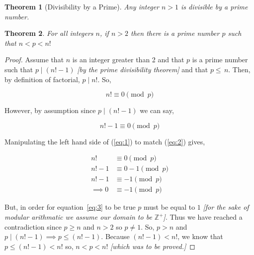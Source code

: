 \documentclass{article}
\newtheorem{theorem}{Theorem}
\begin{document}
\begin{theorem}[Divisibility by a Prime]
Any integer $n>1$ is divisible by a prime number.
\end{theorem}

\begin{theorem}
For all integers $n$, if $n>2$ then there is a prime number $p$ such that $n<p<n\textbf{!}$
\end{theorem}

\begin{proof}
  Assume that $n$ is an integer greater than 2 and that $p$ is a prime number such that $p \mid \left(n\textbf{!} - 1\right)$ \textit{[by the prime divisibility theorem]} and that $p\leq\,n$. Then, by definition of factorial, $p \mid n\textbf{!}$. So, 

  \begin{equation}
    n\textbf{!} \equiv 0 \pmod{p}
  \label{eq:1}
  \end{equation}

  However, by assumption since $p \mid \left(n\textbf{!}-1\right)$ we can say,

  \begin{equation}
    n\textbf{!} - 1 \equiv 0 \pmod{p}
  \label{eq:2}
  \end{equation}

  Manipulating the left hand side of (\ref{eq:1}) to match (\ref{eq:2}) gives,

  \begin{align}
    n\textbf{!} &\equiv 0 \pmod{p} \nonumber \\ 
    n\textbf{!} - 1 &\equiv 0 - 1 \pmod{p} \nonumber \\ 
    n\textbf{!} - 1 &\equiv -1 \pmod{p} \nonumber \\ 
    \implies 0 &\equiv -1 \pmod{p} \label{eq:3}
  \end{align}

  But, in order for equation~\ref{eq:3} to be true $p$ must be equal to $1$ \textit{[for the sake of modular arithmatic we assume our domain to be $\mathbb{Z}^{+}$]}. Thus we have reached a contradiction since $p \geq n$ and $n > 2$ so $p \ne 1$. So, $p > n$ and \\ $p \mid \left(n\textbf{!}-1\right) \implies p \leq \left(n\textbf{!}-1\right)$. Because $\left(n\textbf{!}-1\right) < n\textbf{!}$, we know that \\ $p \leq \left(n\textbf{!}-1\right) < n\textbf{!}$ so, $n < p < n\textbf{!}$ \textit{[which was to be proved.]}
\end{proof}
\end{document}
